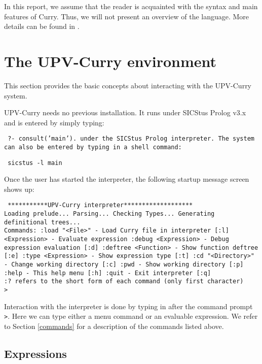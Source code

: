 \documentclass[titlepage,fleqn]{article}
\makeatletter
\newenvironment{prog}{\vspace{0.7ex}\par
\setlength{\parindent}{0.7cm}
\obeylines\@vobeyspaces\tt}
{\vspace{0.7ex}\noindent}
\newcommand{\iniprog}{\begin{prog}}
\newcommand{\finprog}{\end{prog}\noindent}
\newcommand{\pr}[1]{\mbox{\tt #1}}   %
\newcommand{\prompt}{\pr{>}}
\makeatother
\begin{document}
In this report, we assume that
the reader is acquainted with the syntax and main features of Curry.
Thus, we will not present an overview of  the language. 
More details can be found in \cite{Hanus98Curry}.

\section{The UPV-Curry environment}\label{essentials}

This section provides the basic concepts about interacting with the
UPV-Curry system.

UPV-Curry  needs no previous installation. It runs under SICStus Prolog
v3.x and is entered by simply typing:
\iniprog
?- consult('main').
\finprog
under the SICStus Prolog interpreter.
The system can also be entered by typing in a shell command:
\iniprog
sicstus -l main
\finprog

Once the user has started the interpreter, the following startup
message screen shows up:
{
\small
\iniprog
***********UPV-Curry interpreter*******************\\

Loading prelude...
Parsing...
Checking Types...
Generating definitional trees...\\

\pagebreak
Commands:
   :load "<File>"      - Load Curry file in interpreter [:l]
   <Expression>        - Evaluate expression
   :debug <Expression> - Debug expression evaluation    [:d]
   :deftree <Function> - Show function deftree          [:e]
   :type <Expression>  - Show expression type           [:t]
   :cd "<Directory>"   - Change working directory       [:c]
   :pwd                - Show working directory         [:p]
   :help               - This help menu                 [:h]
   :quit               - Exit interpreter               [:q]\\

 :? refers to the short form of each command (only first character)\\

\prompt
\finprog
}
Interaction with the interpreter is done by typing in 
after the command prompt \pr{\prompt }. 
Here we can type either a menu command or an evaluable expression.
We refer to Section \ref{commands} for a description of the
commands listed above.

\subsection{Expressions}\label{Expressions}
\end{document}
